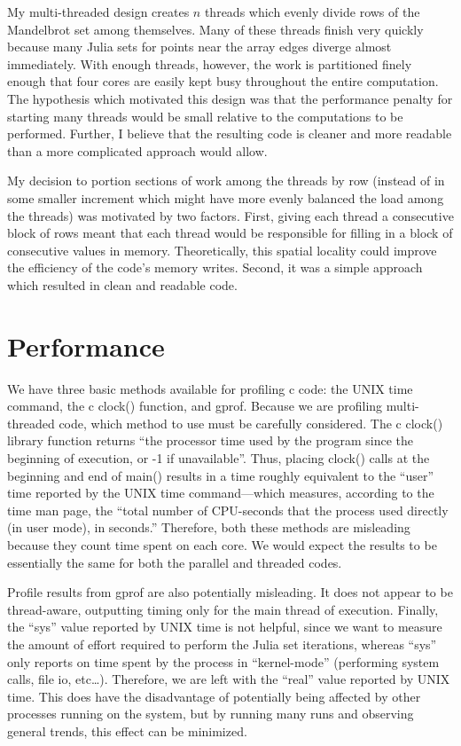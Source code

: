 \documentclass{article}
\begin{document}
My multi-threaded design creates \(n\) threads which evenly divide rows of the Mandelbrot set among themselves. Many of these threads finish very quickly because many Julia sets for points near the array edges diverge almost immediately. With enough threads, however, the work is partitioned finely enough that four cores are easily kept busy throughout the entire computation. The hypothesis which motivated this design was that the performance penalty for starting many threads would be small relative to the computations to be performed. Further, I believe that the resulting code is cleaner and more readable than a more complicated approach would allow.

My decision to portion sections of work among the threads by row (instead of in some smaller increment which might have more evenly balanced the load among the threads) was motivated by two factors. First, giving each thread a consecutive block of rows meant that each thread would be responsible for filling in a block of consecutive values in memory. Theoretically, this spatial locality could improve the efficiency of the code's memory writes. Second, it was a simple approach which resulted in clean and readable code.

\section{Performance}

We have three basic methods available for profiling c code: the UNIX time command, the c clock() function, and gprof. Because we are profiling multi-threaded code, which method to use must be carefully considered. The c clock() library function returns ``the processor time used by the program since the beginning of execution, or -1 if unavailable''\cite[p.255]{cpl}. Thus, placing clock() calls at the beginning and end of main() results in a time roughly equivalent to the ``user'' time reported by the UNIX time command---which measures, according to the time man page, the ``total number of CPU-seconds that the process used directly (in user mode), in seconds.'' Therefore, both these methods are misleading because they count time spent on each core. We would expect the results to be essentially the same for both the parallel and threaded codes.

Profile results from gprof are also potentially misleading. It does not appear to be thread-aware, outputting timing only for the main thread of execution. Finally, the ``sys'' value reported by UNIX time is not helpful, since we want to measure the amount of effort required to perform the Julia set iterations, whereas ``sys'' only reports on time spent by the process in ``kernel-mode'' (performing system calls, file io, etc\ldots). Therefore, we are left with the ``real'' value reported by UNIX time. This does have the disadvantage of potentially being affected by other processes running on the system, but by running many runs and observing general trends, this effect can be minimized.
\end{document}

